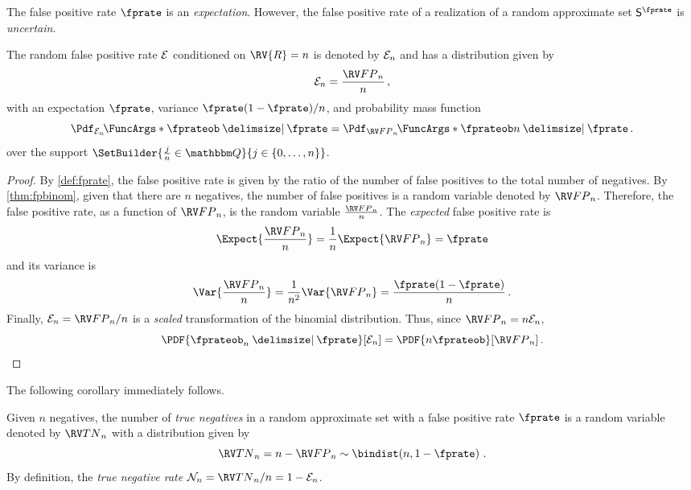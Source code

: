 \documentclass[ ../main.tex]{subfiles}
\begin{document}
The false positive rate $\fprate$ is an \emph{expectation}.
However, the false positive rate of a realization of a random approximate set $\ASet{S}[\fprate]$ is \emph{uncertain}.
\begin{theorem}
\label{thm:fpr}
The random false positive rate $\mathcal{E}$ conditioned on $\RV{R} = n$ is denoted by $\mathcal{E}_n$ and has a distribution given by
\begin{equation}
    \FPR_n = \frac{\FP_n}{n}\,,
\end{equation}
with an expectation $\fprate$, variance $\fprate(1-\fprate) / n$, and probability mass function
\begin{equation}
	\Pdf_{\FPR_n}\!\FuncArgs*{\fprateob \Given \fprate} = \Pdf_{\FP_n}\!\FuncArgs*{\fprateob n \Given \fprate}\,.
\end{equation}
over the support $\SetBuilder{ \frac{j}{n} \in \BlackboardSet{Q}}{j \in \{0,\ldots,n\}}$.
\end{theorem}
\begin{proof}
By \cref{def:fprate}, the false positive rate is given by the ratio of the number of false positives to the total number of negatives.
By \cref{thm:fpbinom}, given that there are $n$ negatives, the number of false positives is a random variable denoted by $\FP_n$.
Therefore, the false positive rate, as a function of $\FP_n$, is the random variable $\frac{\FP_n}{n}$.
The \emph{expected} false positive rate is
\begin{equation}
    \Expect{\frac{\FP_n}{n}} = \frac{1}{n}\Expect{\FP_n} = \fprate
\end{equation}
and its variance is
\begin{equation}
    \Var{\frac{\FP_n}{n}} = \frac{1}{n^2}\Var{\FP_n} = \frac{\fprate(1-\fprate)}{n}\,.
\end{equation}
Finally, $\FPR_n = \FP_n / n$ is a \emph{scaled} transformation of the binomial distribution.
Thus, since $\FP_n = n \FPR_n$,
\begin{equation}
	\PDF{\fprateob_n \Given \fprate}[\FPR_n] = \PDF{n \fprateob}[\FP_n]\,.
\end{equation}
\end{proof}
The following corollary immediately follows.
\begin{corollary}
	\label{cor:tnbinom}
	Given $n$ negatives, the number of \emph{true negatives} in a random approximate set with a false positive rate $\fprate$ is a random variable denoted by $\TN_n$ with a distribution given by
	\begin{equation}
	\TN_n = n - \FP_n \sim \bindist\!\left(n, 1-\fprate\right)\,.
	\end{equation}
	By definition, the \emph{true negative rate} $\TNR_n = \TN_n / n = 1 - \FPR_n$.
\end{corollary}
\end{document}
